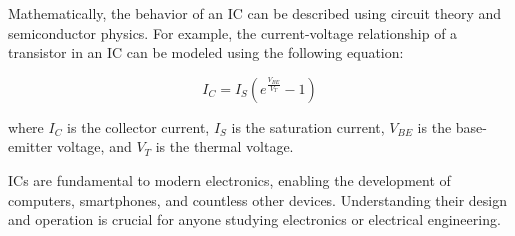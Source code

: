 Mathematically, the behavior of an IC can be described using circuit theory and semiconductor physics. For example, the current-voltage relationship of a transistor in an IC can be modeled using the following equation:

\[
I_C = I_S \left( e^{\frac{V_{BE}}{V_T}} - 1 \right)
\]

where \( I_C \) is the collector current, \( I_S \) is the saturation current, \( V_{BE} \) is the base-emitter voltage, and \( V_T \) is the thermal voltage.

ICs are fundamental to modern electronics, enabling the development of computers, smartphones, and countless other devices. Understanding their design and operation is crucial for anyone studying electronics or electrical engineering.

